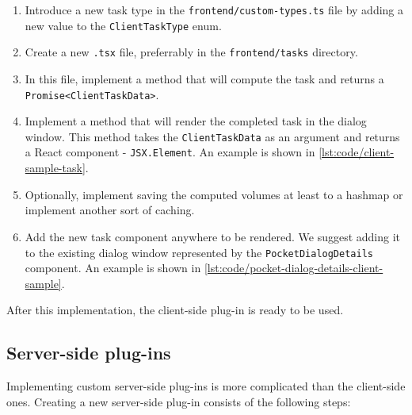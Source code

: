 \begin{enumerate}
    \item Introduce a new task type in the \texttt{frontend/custom-types.ts} file by adding a new value to the \texttt{ClientTaskType} enum.
    \item Create a new \texttt{.tsx} file, preferrably in the \texttt{frontend/tasks} directory.
    \item In this file, implement a method that will compute the task and returns a \texttt{Promise<ClientTaskData>}.
    \item Implement a method that will render the completed task in the dialog window. This method takes the \texttt{ClientTaskData} as an argument and returns a React component - \texttt{JSX.Element}. An example is shown in \cref{lst:code/client-sample-task}.
    \item Optionally, implement saving the computed volumes at least to a hashmap or implement another sort of caching.
    \item Add the new task component anywhere to be rendered. We suggest adding it to the existing dialog window represented by the \texttt{PocketDialogDetails} component. An example is shown in \cref{lst:code/pocket-dialog-details-client-sample}.
\end{enumerate}



After this implementation, the client-side plug-in is ready to be used.



\subsection{Server-side plug-ins}
\label{subsec:dev_server_side}

Implementing custom server-side plug-ins is more complicated than the client-side ones. Creating a new server-side plug-in consists of the following steps:

